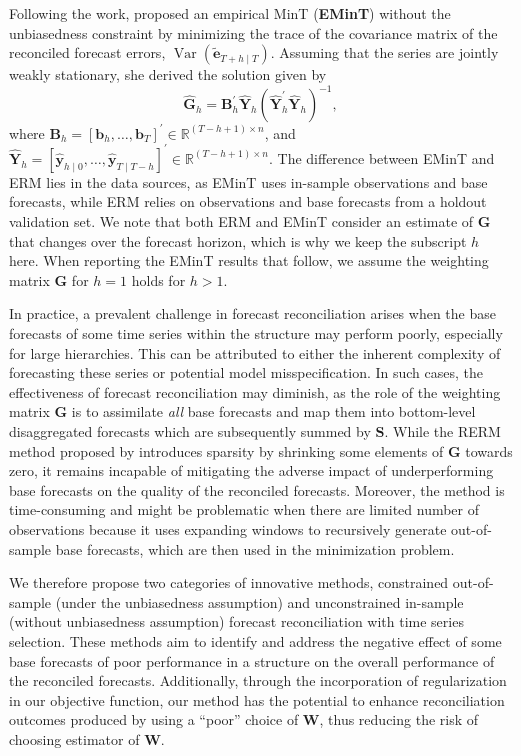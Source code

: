 \documentclass[
  12pt,
  11pt]{article}
\begin{document}
Following the work, \citet{Wickramasuriya2021-am} proposed an empirical
MinT (\textbf{EMinT}) without the unbiasedness constraint by minimizing
the trace of the covariance matrix of the reconciled forecast errors,
\(\operatorname{Var}(\tilde{\bm{e}}_{T+h \mid T})\). Assuming that the
series are jointly weakly stationary, she derived the solution given by
\[
\hat{\bm{G}}_{h} = \bm{B}_{h}^{\prime}\hat{\bm{Y}}_{h}\left(\hat{\bm{Y}}_{h}^{\prime}\hat{\bm{Y}}_{h}\right)^{-1},
\] where
\(\bm{B}_{h}=\left[\bm{b}_{h}, \ldots, \bm{b}_T\right]^{\prime} \in \mathbb{R}^{\left(T-h+1\right) \times n}\),
and
\(\hat{\bm{Y}}_{h}=\left[\hat{\bm{y}}_{h \mid 0}, \ldots, \hat{\bm{y}}_{T \mid T-h}\right]^{\prime} \in \mathbb{R}^{\left(T-h+1\right) \times n}\).
The difference between EMinT and ERM lies in the data sources, as EMinT
uses in-sample observations and base forecasts, while ERM relies on
observations and base forecasts from a holdout validation set. We note
that both ERM and EMinT consider an estimate of \(\bm{G}\) that changes
over the forecast horizon, which is why we keep the subscript \(h\)
here. When reporting the EMinT results that follow, we assume the
weighting matrix \(\bm{G}\) for \(h=1\) holds for \(h>1\).

In practice, a prevalent challenge in forecast reconciliation arises
when the base forecasts of some time series within the structure may
perform poorly, especially for large hierarchies. This can be attributed
to either the inherent complexity of forecasting these series or
potential model misspecification. In such cases, the effectiveness of
forecast reconciliation may diminish, as the role of the weighting
matrix \(\bm{G}\) is to assimilate \emph{all} base forecasts and map
them into bottom-level disaggregated forecasts which are subsequently
summed by \(\bm{S}\). While the RERM method proposed by
\citet{Ben_Taieb2019-be} introduces sparsity by shrinking some elements
of \(\bm{G}\) towards zero, it remains incapable of mitigating the
adverse impact of underperforming base forecasts on the quality of the
reconciled forecasts. Moreover, the method is time-consuming and might
be problematic when there are limited number of observations because it
uses expanding windows to recursively generate out-of-sample base
forecasts, which are then used in the minimization problem.

We therefore propose two categories of innovative methods, constrained
out-of-sample (under the unbiasedness assumption) and unconstrained
in-sample (without unbiasedness assumption) forecast reconciliation with
time series selection. These methods aim to identify and address the
negative effect of some base forecasts of poor performance in a
structure on the overall performance of the reconciled forecasts.
Additionally, through the incorporation of regularization in our
objective function, our method has the potential to enhance
reconciliation outcomes produced by using a ``poor'' choice of
\(\bm{W}\), thus reducing the risk of choosing estimator of \(\bm{W}\).
\end{document}
